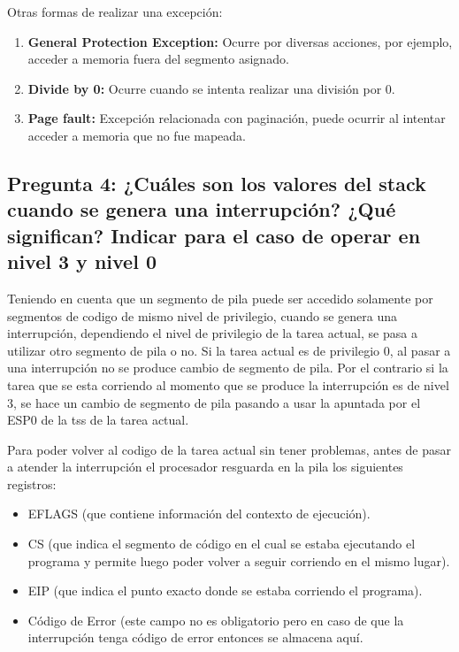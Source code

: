 \documentclass[a4paper,10pt,twoside]{article}
\begin{document}
Otras formas de realizar una excepción:
\begin{enumerate}
	\item \textbf{General Protection Exception:}
	Ocurre por diversas acciones, por ejemplo, acceder a memoria fuera del segmento asignado.
	\item \textbf{Divide by 0:}
	Ocurre cuando se intenta realizar una división por 0.
	\item \textbf{Page fault:}
	Excepción relacionada con paginación, puede ocurrir al intentar acceder a memoria que no fue mapeada.
\end{enumerate}


\subsection{Pregunta 4: ¿Cuáles son los valores del stack cuando se genera una interrupción? ¿Qué significan? Indicar para el caso de operar en nivel 3 y nivel 0}

Teniendo en cuenta que un segmento de pila puede ser accedido solamente por segmentos de codigo de mismo nivel de privilegio, cuando se genera una interrupción, dependiendo el nivel de privilegio de la tarea actual, se pasa a utilizar otro segmento de pila o no. Si la tarea actual es de privilegio 0, al pasar a una interrupción no se produce cambio de segmento de pila. Por el contrario si la tarea que se esta corriendo al momento que se produce la interrupción es de nivel 3, se hace un cambio de segmento de pila pasando a usar la apuntada por el ESP0 de la tss de la tarea actual.

Para poder volver al codigo de la tarea actual sin tener problemas, antes de pasar a atender la interrupción el procesador resguarda en la pila los siguientes registros:

\begin{itemize}
 \item EFLAGS (que contiene información del contexto de ejecución).
 \item CS (que indica el segmento de código en el cual se estaba ejecutando el programa y permite luego poder volver a seguir corriendo en el mismo lugar).
 \item EIP (que indica el punto exacto donde se estaba corriendo el programa).
 \item Código de Error (este campo no es obligatorio pero en caso de que la interrupción tenga código de error entonces se almacena aquí.
\end{itemize}
\end{document}
